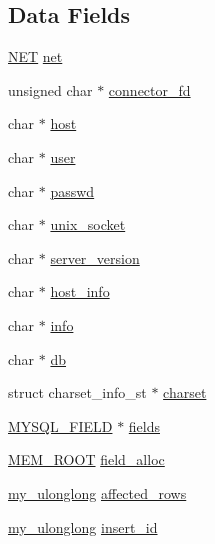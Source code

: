 \subsection*{Data Fields}
\begin{DoxyCompactItemize}
\item 
\hyperlink{mysql__com_8h_a6869c9fe9e26bbedea92d6603825d482}{N\+E\+T} \hyperlink{structst__mysql_a4ad66660f7b58712cb4bcaa852d4048c}{net}
\item 
unsigned char $\ast$ \hyperlink{structst__mysql_a88b1d70cf9bc81ce088f0a3418d6429c}{connector\+\_\+fd}
\item 
char $\ast$ \hyperlink{structst__mysql_aa63af77ef72c5732d53d735a67d20714}{host}
\item 
char $\ast$ \hyperlink{structst__mysql_ad5bf53f25b64492bee18c140c11081b6}{user}
\item 
char $\ast$ \hyperlink{structst__mysql_a63e75633e001c08953663a632819b285}{passwd}
\item 
char $\ast$ \hyperlink{structst__mysql_a1a1abcf3441139031de0aa767207dc6a}{unix\+\_\+socket}
\item 
char $\ast$ \hyperlink{structst__mysql_a72928c42be914f8c12aa24331c542b69}{server\+\_\+version}
\item 
char $\ast$ \hyperlink{structst__mysql_afcd1b31ab175617ee15a9c26a6258457}{host\+\_\+info}
\item 
char $\ast$ \hyperlink{structst__mysql_acd1bb786ff93e6a27ec5028864945a5a}{info}
\item 
char $\ast$ \hyperlink{structst__mysql_add1f635a8aea354868cfe57dba0d6298}{db}
\item 
struct charset\+\_\+info\+\_\+st $\ast$ \hyperlink{structst__mysql_a5d128ecd21c6265f37c283824b3ad813}{charset}
\item 
\hyperlink{mysql_8h_ad010774d7ae34dc28a2e044ed2cd4f71}{M\+Y\+S\+Q\+L\+\_\+\+F\+I\+E\+L\+D} $\ast$ \hyperlink{structst__mysql_aa31b4c644fcef355ce347977a47be9b2}{fields}
\item 
\hyperlink{my__alloc_8h_ac59e289b254a2c5ac634ffcedda3f823}{M\+E\+M\+\_\+\+R\+O\+O\+T} \hyperlink{structst__mysql_a170585335f5edffeaae3f5229f6c1f6b}{field\+\_\+alloc}
\item 
\hyperlink{mysql_8h_ae05bd5d3e5a75578e2f14cfeb43f07aa}{my\+\_\+ulonglong} \hyperlink{structst__mysql_acf6930c0bcb39cc19665b1a4142ba559}{affected\+\_\+rows}
\item 
\hyperlink{mysql_8h_ae05bd5d3e5a75578e2f14cfeb43f07aa}{my\+\_\+ulonglong} \hyperlink{structst__mysql_a884df86e03be14c772cfe48511963fc1}{insert\+\_\+id}

\end{DoxyCompactItemize}
